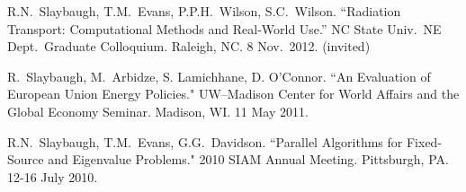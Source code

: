 \begin{bibsection}

\item R.N.\ Slaybaugh, T.M.\ Evans, P.P.H.\ Wilson, S.C.\ Wilson. ``Radiation Transport: Computational Methods and Real-World Use.'' NC State Univ.\ NE Dept.\ Graduate Colloquium. Raleigh, NC. 8 Nov.\ 2012. (invited)


\item R.\ Slaybaugh, M.\ Arbidze, S. Lamichhane, D. O'Connor. ``An Evaluation of European Union Energy Policies." UW--Madison Center for World Affairs and the Global Economy Seminar. Madison, WI. 11 May 2011.


\item R.N.\ Slaybaugh, T.M.\ Evans, G.G.\ Davidson. ``Parallel Algorithms for Fixed-Source and Eigenvalue Problems." 2010 SIAM Annual Meeting. Pittsburgh, PA. 12-16 July 2010.



\end{bibsection}


